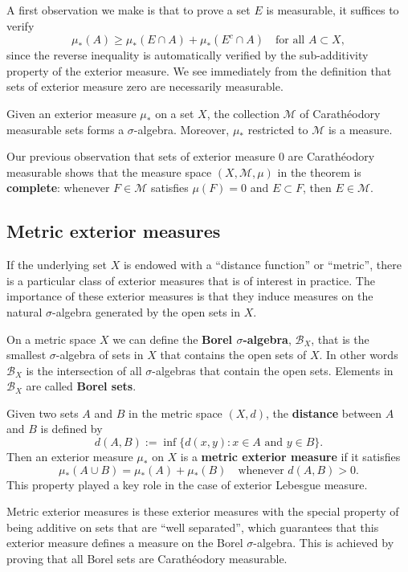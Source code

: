 A first observation we make is that to prove a set $E$ is measurable, it suffices to verify 
\[
  \mu_*(A) \geq \mu_*(E\cap A) + \mu_*(E^c\cap A)\quad \text{for all }A\subset X,
\]
since the reverse inequality is automatically verified by the sub-additivity property of the exterior measure.
We see immediately from the definition that sets of exterior measure zero are necessarily measurable.

\begin{theorem}
  Given an exterior measure $\mu_*$ on a set $X$, the collection $\mathcal M$ of Carath\'eodory measurable sets forms a $\sigma$-algebra. 
  Moreover, $\mu_*$ restricted to $\mathcal M$ is a measure.
\end{theorem}

Our previous observation that sets of exterior measure $0$ are Carath\'eodory measurable shows that
the measure space $(X,\mathcal M,\mu)$ in the theorem is \textbf{complete}: 
whenever $F\in\mathcal M$ satisfies $\mu(F) = 0$ and $E\subset F$, then $E\in\mathcal M$.

\subsection{Metric exterior measures}

If the underlying set $X$ is endowed with a ``distance function'' or ``metric'',
there is a particular class of exterior measures that is of interest in practice. 
The importance of these exterior measures is that they induce measures on the natural $\sigma$-algebra 
generated by the open sets in $X$.

On a metric space $X$ we can define the \textbf{Borel $\sigma$-algebra}, $\mathcal B_X$, 
that is the smallest $\sigma$-algebra of sets in $X$ that contains the open sets of $X$. 
In other words $\mathcal B_X$ is the intersection of all $\sigma$-algebras that contain the open sets.
Elements in $\mathcal B_X$ are called \textbf{Borel sets}.

Given two sets $A$ and $B$ in the metric space $(X, d)$, 
the \textbf{distance} between $A$ and $B$ is defined by 
\[
d(A,B) := \inf\{d(x,y) : x\in A \text{ and } y\in B\}.
\]
Then an exterior measure $\mu_*$ on $X$ is a \textbf{metric exterior measure} if it satisfies 
\[
\mu_*(A\cup B) = \mu_*(A) + \mu_*(B)\quad \text{whenever } d(A,B)>0.
\]
This property played a key role in the case of exterior Lebesgue measure.

Metric exterior measures is these exterior measures with the special property of being additive on sets that are ``well separated'', 
which guarantees that this exterior measure defines a measure on the Borel $\sigma$-algebra.
This is achieved by proving that all Borel sets are Carath\'eodory measurable.

